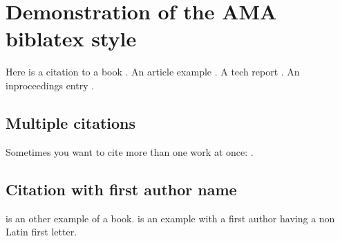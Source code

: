 \documentclass[a4paper,12pt]{article}
\begin{document}
\section*{Demonstration of the AMA biblatex style}

Here is a citation to a book \cite{whole-collection}.  
An article example \parencite{article-minimal}.  
A tech report \cite{techreport-minimal}.  
An inproceedings entry \cite{inproceedings-full}.  

\subsection*{Multiple citations}
Sometimes you want to cite more than one work at once:  
\parencite{article-minimal,techreport-minimal,whole-collection}.

\subsection*{Citation with first author name}
\textcite{Lamport:Book:1989} is an other example of a book.
\textcite{Smigoc:FRONTNEURO:2023} is an example with a first author having a non Latin first letter.

\printbibliography
\end{document}
